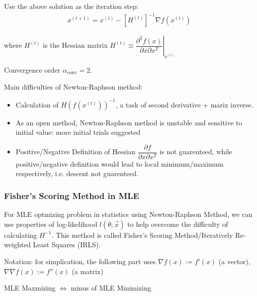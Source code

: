     Use the above solution as the iteration step:
    \begin{align}
        x^{(t+1)}=x^{(t)} - \left[H^{(t)}\right]^{-1}\nabla f(x^{(t)})
    \end{align}
    
    where $ H^{(t)} $ is the Hessian matrix $ H^{(t)}\equiv \left.\dfrac{\partial^{2}f(x) }{\partial x\partial x^T}\right|_{x^{(t)}} $
    
    Convergence order $ \alpha_\mathrm{conv} =2 $.

    \begin{point}
        Main difficulties of Newton-Raphson method: 
    \end{point}

    \begin{itemize}[topsep=2pt,itemsep=0pt]
        \item Calculation of $ H(f(x^{(t)}))^{-1} $, a task of second derivative + marix inverse.
        \item As an open method, Newton-Raphson  method is unstable and sensitive to initial value: more initial trials suggested
        \item Positive/Negative Definition of Hessian $ \dfrac{\partial f}{\partial x\partial x ^T} $ is not guarenteed, while positive/negative definition would lead to local minimum/maximum respectively, i.e. descent not guarenteed.
    \end{itemize}
    
        
    
\subsubsection{Fisher's Scoring Method in MLE}\label{SubSubSectionFisherScoringMethod}
    \hypertarget{FSNRMethod}{}For MLE optmizing problem in statistics using Newton-Raphson Method, we can use properties of log-likelihood $ l(\theta ;\vec{x}) $ to help overcome the difficulty of calculating $ H^{-1} $. This method is called Fisher's Scoring Method/Iteratively Re-weighted Least Squares (IRLS).

    Notation: for simplication, the following part uses $ \nabla f(x):=f'(x) $ (a vector), $ \nabla\nabla f(x):=f''(x) $ (a matrix)

\begin{point}
    MLE Maxmizing $ \Leftrightarrow $ minus of MLE Minimizing
\end{point}

